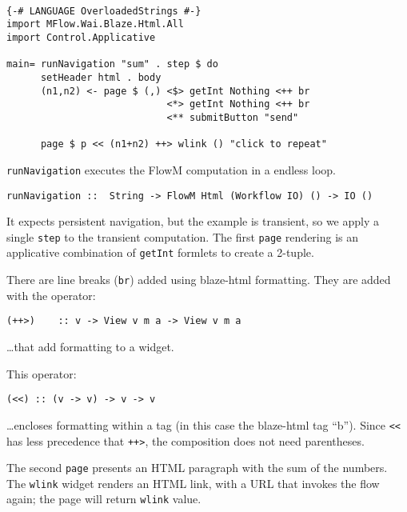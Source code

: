 \documentclass{tmr}
\begin{document}
 
 
{\tt 
 
\begin{verbatim} 
 
{-# LANGUAGE OverloadedStrings #-} 
import MFlow.Wai.Blaze.Html.All 
import Control.Applicative 
 
main= runNavigation "sum" . step $ do 
      setHeader html . body 
      (n1,n2) <- page $ (,) <$> getInt Nothing <++ br 
                            <*> getInt Nothing <++ br 
                            <** submitButton "send" 
 
      page $ p << (n1+n2) ++> wlink () "click to repeat" 
\end{verbatim} 
 
} 
 
{\tt runNavigation} executes the FlowM computation in a endless loop. 
 
{\tt 
 
\begin{verbatim} 
runNavigation ::  String -> FlowM Html (Workflow IO) () -> IO () 
\end{verbatim} 
 
} 
It expects persistent navigation, but the example is transient, so we apply a single {\tt step} to the transient computation. The first {\tt page} rendering is an applicative combination of {\tt getInt} formlets to create a 2-tuple. 

There are line breaks ({\tt br}) added using blaze-html formatting. They are added with the operator: 
 
{\tt 
 
\begin{verbatim} 
(++>)    :: v -> View v m a -> View v m a 
\end{verbatim} 
 
} 
 
\ldots that add formatting to a widget.

This operator:

{\tt 
 
\begin{verbatim} 
(<<) :: (v -> v) -> v -> v
\end{verbatim} 
 
} 
\ldots encloses formatting within a tag (in this case the blaze-html tag ``b'').  Since {\tt <<} has less precedence that {\tt ++>}, the composition does not need parentheses.
 
The second {\tt page} presents an HTML paragraph with the sum of the 
numbers. The {\tt wlink} widget renders an HTML link, with a URL that invokes the flow again; the page will return {\tt wlink} value.
 
\end{document}
